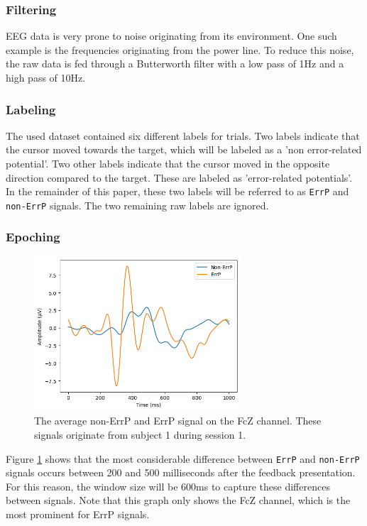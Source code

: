 \subsubsection{Filtering}

EEG data is very prone to noise originating from its environment. One such example is the frequencies originating from the power line. To reduce this noise, the raw data is fed through a Butterworth filter with a low pass of 1Hz and a high pass of 10Hz.

\subsubsection{Labeling}

The used dataset contained six different labels for trials. Two labels indicate that the cursor moved towards the target, which will be labeled as a 'non error-related potential'. Two other labels indicate that the cursor moved in the opposite direction compared to the target. These are labeled as 'error-related potentials'. In the remainder of this paper, these two labels will be referred to as \verb|ErrP| and \verb|non-ErrP| signals. The two remaining raw labels are ignored.

\subsubsection{Epoching}

\begin{figure}[!tbp]
    \centering
        \includegraphics[width=7.7cm]{img/FcZs1s1-1000ms.png}
    \caption{The average non-ErrP and ErrP signal on the FcZ channel. These signals originate from subject 1 during session 1.}
    \label{fig:FcZ}
\end{figure}

Figure \ref{fig:FcZ} shows that the most considerable difference between \verb|ErrP| and \verb|non-ErrP| signals occurs between 200 and 500 milliseconds after the feedback presentation. For this reason, the window size will be 600ms to capture these differences between signals. Note that this graph only shows the FcZ channel, which is the most prominent for ErrP signals.

